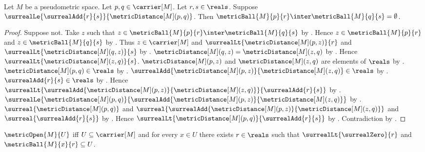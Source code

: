 \begin{theorem}\label{metric_balls_disjoint}
    Let $M$ be a pseudometric space.
    Let $p,q\in\carrier[M]$.
    Let $r,s\in\reals$.
    Suppose
        $\surrealLe{\surrealAdd{r}{s}}{\metricDistance[M](p,q)}$.
    Then
        $\metricBall{M}{p}{r}\inter\metricBall{M}{q}{s}
            =\emptyset$.
\end{theorem}
\begin{proof}
    Suppose not.
    Take $z$ such that
        $z\in\metricBall{M}{p}{r}\inter\metricBall{M}{q}{s}$
        by .
    Hence $z\in\metricBall{M}{p}{r}$ and
        $z\in\metricBall{M}{q}{s}$ by .
    Thus $z\in\carrier[M]$ and
        $\surrealLt{\metricDistance[M](p,z)}{r}$ and
        $\surrealLt{\metricDistance[M](q,z)}{s}$
        by .
    $\metricDistance[M](q,z)=\metricDistance[M](z,q)$
        by .
    Hence $\surrealLt{\metricDistance[M](z,q)}{s}$.
    $\metricDistance[M](p,z)$ and
        $\metricDistance[M](z,q)$ are elements of $\reals$
        by .
    $\metricDistance[M](p,q)\in\reals$
        by .
    $\surrealAdd{\metricDistance[M](p,z)}
        {\metricDistance[M](z,q)}\in\reals$
        by .
    $\surrealAdd{r}{s}\in\reals$
        by .
    Hence
        $\surrealLt{
            \surrealAdd{\metricDistance[M](p,z)}
                {\metricDistance[M](z,q)}}
            {\surrealAdd{r}{s}}$
        by .
    $\surrealLe{\metricDistance[M](p,q)}
        {\surrealAdd{\metricDistance[M](p,z)}
            {\metricDistance[M](z,q)}}$
        by .
    $\surreal{\metricDistance[M](p,q)}$ and
        $\surreal{\surrealAdd{\metricDistance[M](p,z)}
            {\metricDistance[M](z,q)}}$ and
        $\surreal{\surrealAdd{r}{s}}$
        by .
    Hence
        $\surrealLt{\metricDistance[M](p,q)}{\surrealAdd{r}{s}}$
        by .
    Contradiction by .
\end{proof}

\begin{definition}\label{metric_open}
    $\metricOpen{M}{U}$ iff
        $U\subseteq\carrier[M]$ and
        for every $x\in U$ there exists $r\in\reals$ such that
            $\surrealLt{\surrealZero}{r}$ and
            $\metricBall{M}{x}{r}\subseteq U$.
\end{definition}

